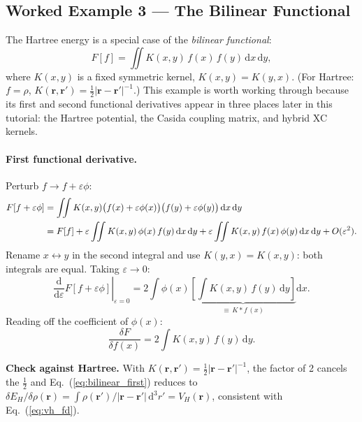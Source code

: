 \documentclass[12pt,letterpaper]{article}
\newcommand{\dd}{\mathrm{d}}
\theoremstyle{definition}
\begin{document}
\subsection{Worked Example 3 --- The Bilinear Functional}

The Hartree energy is a special case of the \emph{bilinear functional}:
\begin{equation}
  F[f] = \iint K(x,y)\,f(x)\,f(y)\,\dd x\,\dd y,
  \label{eq:bilinear_F}
\end{equation}
where $K(x,y)$ is a fixed symmetric kernel, $K(x,y)=K(y,x)$.
(For Hartree: $f=\rho$, $K(\bm{r},\bm{r}')=\tfrac{1}{2}|\bm{r}-\bm{r}'|^{-1}$.)
This example is worth working through because its first and second functional
derivatives appear in three places later in this tutorial: the Hartree potential,
the Casida coupling matrix, and hybrid XC kernels.

\paragraph{First functional derivative.}
\begin{derivbox}
Perturb $f \to f + \varepsilon\phi$:
\begin{align}
  F[f+\varepsilon\phi]
  &= \iint K(x,y)\bigl(f(x)+\varepsilon\phi(x)\bigr)
                    \bigl(f(y)+\varepsilon\phi(y)\bigr)\,\dd x\,\dd y \notag\\
  &= F[f]
     + \varepsilon\iint K(x,y)\,\phi(x)\,f(y)\,\dd x\,\dd y
     + \varepsilon\iint K(x,y)\,f(x)\,\phi(y)\,\dd x\,\dd y
     + O(\varepsilon^2).
\end{align}
Rename $x\leftrightarrow y$ in the second integral and use $K(y,x)=K(x,y)$:
both integrals are equal.  Taking $\varepsilon\to 0$:
\begin{equation}
  \left.\frac{\dd}{\dd\varepsilon}F[f+\varepsilon\phi]\right|_{\varepsilon=0}
  = 2\int\phi(x)\underbrace{\left[\int K(x,y)\,f(y)\,\dd y\right]}_{
    \equiv\,K*f\,(x)}\dd x.
\end{equation}
Reading off the coefficient of $\phi(x)$:
\begin{equation}
  \boxed{\frac{\delta F}{\delta f(x)} = 2\int K(x,y)\,f(y)\,\dd y.}
  \label{eq:bilinear_first}
\end{equation}
\end{derivbox}

\noindent\textbf{Check against Hartree.}
With $K(\bm{r},\bm{r}')=\tfrac{1}{2}|\bm{r}-\bm{r}'|^{-1}$, the factor of 2
cancels the $\tfrac{1}{2}$ and Eq.~(\ref{eq:bilinear_first}) reduces to
$\delta E_H/\delta\rho(\bm{r}) = \int \rho(\bm{r}')/|\bm{r}-\bm{r}'|\,\dd^3r' = V_H(\bm{r})$,
consistent with Eq.~(\ref{eq:vh_fd}).
\end{document}
